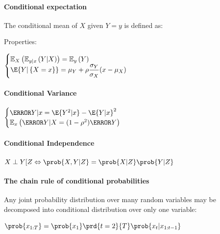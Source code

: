 \paragraph{Conditional expectation}
The conditional mean of $X$ given $Y=y$ is defined as:
\begin{center}
\end{center}

Properties:
\begin{center}
	$\begin{cases}
        \mathbb{E}_{X}\left(\mathbb{E}_{y|x}\left(Y|X\right)\right)=
        \mathbb{E}_{y}\left(Y\right)\\
	\E{Y|\left\{ X=x \right\}}=\mu_{Y}+\rho\dfrac{\sigma_{Y}}{\sigma_{X}}(x-\mu_{X})
	\end{cases}$	
\end{center}


\paragraph{Conditional Variance}
\begin{center}
	$\begin{cases}
	\V{Y|x}=\E{Y^{2}|x}-\E{Y|x}^{2}\\
	\mathbb{E}_{x}\left( \V{Y|X}=(1-\rho^{2})\V{Y} \right)
	\end{cases}$
\end{center}


\paragraph{Conditional Independence}
$X\perp Y[Z \Leftrightarrow \prob{X,Y|Z}=\prob{X|Z}\prob{Y|Z}$

\paragraph{The chain rule of conditional probabilities}
Any joint probability distribution over many random variables may be decomposed into conditional
distribution over only one variable:
\begin{center}
    $\prob{x_{1:T}} = \prob{x_{1}}\prd{t=2}{T}\prob{x_{t}|x_{1:t-1}}$
\end{center}



